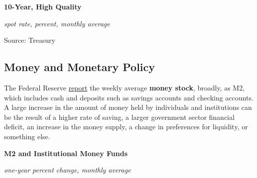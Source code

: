 \documentclass{report}
\makeatletter
\newcommand{\tbllink}[1]{\href{https://raw.githubusercontent.com/bdecon/US-chartbook/master/chartbook/data/#1}{\faTable}}
\newcommand*\short[1]{\expandafter\@gobbletwo\number\numexpr#1\relax}
\newcommand{\dateaxisticks}{
		date coordinates in=x, axis line style={draw=none},
		xmax={2020-10-01},
		max space between ticks=40,	    
		xtick={{1990-01-01}, {1992-01-01}, {1994-01-01}, 
			{1996-01-01}, {1998-01-01}, {2000-01-01}, 
			{2002-01-01}, {2004-01-01}, {2006-01-01},
			{2008-01-01}, {2010-01-01}, {2012-01-01}, {2014-01-01},
		    {2016-01-01}, {2018-01-01}, {2020-01-01}},
		minor xtick={{1989-01-01}, {1991-01-01}, {1993-01-01},
			{1995-01-01}, {1997-01-01}, {1999-01-01}, 
			{2001-01-01}, {2003-01-01}, {2005-01-01}, {2007-01-01},
		    {2009-01-01}, {2011-01-01}, {2013-01-01}, {2015-01-01},
		    {2017-01-01}, {2019-01-01}},
		enlarge y limits={0.06}, enlarge x limits={0.01},
		}
\newcommand{\shdateaxisticks}{
		date coordinates in=x, axis line style={draw=none},
		xmax={2020-11-15},
		max space between ticks=40,	    
		xtick={{1990-01-01}, {1995-01-01}, {2000-01-01}, 
			{2005-01-01}, {2010-01-01}, {2015-01-01}, {2020-01-01}},
		minor xtick={},
		enlarge y limits={0.06}, enlarge x limits={0.01},
		}
\newcommand{\bbar}[2]{extra #1 ticks = {{#2}}, extra #1 tick labels = ,
		extra #1 tick style = {grid=major, grid style={thick, black!25}},}
\newcommand{\stdline}[4]{\addplot[very thick, no markers, color=#1] 
		table [x=#2, y=#3, col sep=comma] {#4};	}
\newcommand{\thickline}[4]{\addplot[ultra thick, no markers, color=#1] 
		table [x=#2, y=#3, col sep=comma] {#4};	}
\newcommand{\rbars}{
		\fill[color=black!10] (axis cs:{1990-07-01},\pgfkeysvalueof{/pgfplots/ymin}) rectangle 
			(axis cs:{1991-03-01}, \pgfkeysvalueof{/pgfplots/ymax});
		\fill[color=black!10] (axis cs:{2007-12-01},\pgfkeysvalueof{/pgfplots/ymin}) rectangle 
			(axis cs:{2009-07-01}, \pgfkeysvalueof{/pgfplots/ymax});
		\fill[color=black!10] (axis cs:{2001-03-01},\pgfkeysvalueof{/pgfplots/ymin}) rectangle 
			(axis cs:{2001-11-01}, \pgfkeysvalueof{/pgfplots/ymax});
		\fill[color=black!10] (axis cs:{2020-02-01},\pgfkeysvalueof{/pgfplots/ymin}) rectangle 
			(axis cs:{2020-10-01}, \pgfkeysvalueof{/pgfplots/ymax});}
\makeatother
\begin{document}
{{{{{{{{{\begin{minipage}{0.27\textwidth}
\end{minipage}\hspace{8mm} \begin{minipage}{0.43\textwidth}
\normalsize \textbf{10-Year, High Quality}

\footnotesize{\textit{spot rate, percent, monthly average}}

\hspace*{-2mm} 

\footnotesize{Source: Treasury} \hfill \tbllink{hqcb.csv}
\end{minipage}
\newpage
\begin{minipage}{0.76\textwidth}

\subsection*{\color{black!70} \seriffont Money and Monetary Policy}

\small The Federal Reserve \href{https://www.federalreserve.gov/releases/h6/current/default.htm}{report} the weekly average \textbf{money stock}, broadly, as M2, which includes cash and deposits such as savings accounts and checking accounts. \\

A large increase in the amount of money held by individuals and institutions can be the result of a higher rate of saving, a larger government sector financial deficit, an increase in the money supply, a change in preferences for liquidity, or something else. 

\vspace{4mm}

\normalsize \textbf{M2 and Institutional Money Funds}

\footnotesize{\textit{one-year percent change, monthly average}}

\hspace*{-2mm} 


\end{minipage}}}}}}}}}}
\end{document}
